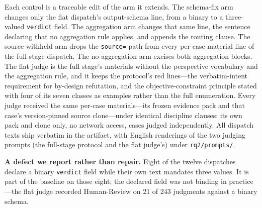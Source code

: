 \documentclass[acmsmall,screen,review,anonymous]{acmart}
\begin{document}
Each control is a traceable edit of the arm it extends. The schema-fix arm changes only the flat
dispatch's output-schema line, from a binary to a three-valued \texttt{verdict} field. The
aggregation arm changes that same line, the sentence declaring that no aggregation rule applies, and
appends the routing clause. The source-withheld arm drops the \texttt{source=} path from every
per-case material line of the full-stage dispatch. The no-aggregation arm excises both aggregation
blocks. The flat judge is the full stage's materials without the perspective vocabulary and the
aggregation rule, and it keeps the protocol's red lines---the verbatim-intent requirement for
by-design refutation, and the objective-constraint principle stated with four of its seven classes
as examples rather than the full enumeration. Every judge received the same per-case materials---its
frozen evidence pack and that case's version-pinned source clone---under identical discipline
clauses: its own pack and clone only, no network access, cases judged independently. All dispatch
texts ship verbatim in the artifact, with English renderings of the two judging prompts (the
full-stage protocol and the flat judge's) under \texttt{rq2/prompts/}.

\textbf{A defect we report rather than repair.} Eight of the twelve dispatches declare a binary
\texttt{verdict} field while their own text mandates three values. It is part of the baseline on
those eight; the declared field was not binding in practice---the flat judge recorded Human-Review on
21 of 243 judgments against a binary schema.
\end{document}
